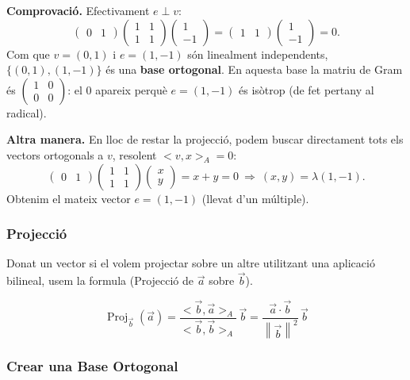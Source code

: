 \documentclass[12pt]{article}
\begin{document}
\begin{examplebox}{}
    \textbf{Comprovació.} Efectivament $e\perp v$:
    \[\begin{pmatrix}0&1\end{pmatrix}\begin{pmatrix}1&1\\1&1\end{pmatrix}\begin{pmatrix}1\\-1\end{pmatrix}=\begin{pmatrix}1&1\end{pmatrix}\begin{pmatrix}1\\-1\end{pmatrix}=0.\]
    Com que $v=(0,1)$ i $e=(1,-1)$ són linealment independents, $\{(0,1),(1,-1)\}$ és una \textbf{base ortogonal}. En aquesta base la matriu de Gram és $\begin{pmatrix}1&0\\0&0\end{pmatrix}$: el $0$ apareix perquè $e=(1,-1)$ és isòtrop (de fet pertany al radical).

    \textbf{Altra manera.} En lloc de restar la projecció, podem buscar directament tots els vectors ortogonals a $v$, resolent $< v,x>_A=0$:
    \[\begin{pmatrix}0&1\end{pmatrix}\begin{pmatrix}1&1\\1&1\end{pmatrix}\begin{pmatrix}x\\y\end{pmatrix}=x+y=0
    \ \Longrightarrow\ (x,y)=\lambda(1,-1).\]
    Obtenim el mateix vector $e=(1,-1)$ (llevat d'un múltiple).
\end{examplebox}

\subsubsection{Projecció}

Donat un vector si el volem projectar sobre un altre utilitzant una aplicació bilineal, usem la formula (Projecció de $\vec{a}$ sobre $\vec{b}$).

\[\operatorname{Proj}_{\vec{b}}(\vec{a}) = \frac{< \vec{b}, \vec{a}>_A}{< \vec{b},\vec{b}>_A}\,\vec{b} = \frac{\vec{a}\cdot\vec{b}}{\left\|\vec{b}\right\|^2}\,\vec{b}\]

\subsubsection{Crear una Base Ortogonal}
\end{document}
